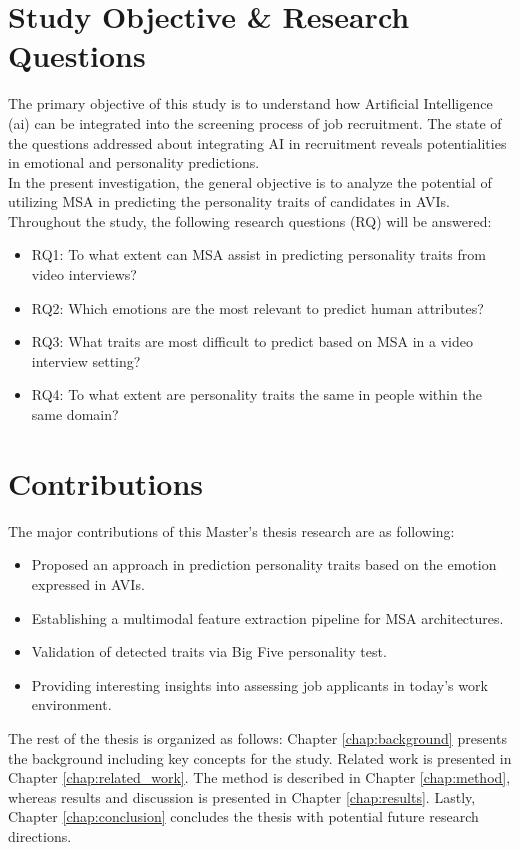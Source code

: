 \section{Study Objective \& Research Questions}
The primary objective of this study is to understand how Artificial Intelligence (\acrshort{ai}) can be integrated into the screening process of job recruitment. The state of the questions addressed about integrating AI in recruitment reveals potentialities in emotional and personality predictions. \\

In the present investigation, the general objective is to analyze the potential of utilizing MSA in predicting the personality traits of candidates in AVIs. Throughout the study, the following research questions (RQ) will be answered:
%
\begin{itemize}
    \item[] RQ1: To what extent can MSA assist in predicting personality traits from video interviews? \\
    \item[] RQ2: Which emotions are the most relevant to predict human attributes? \\
    \item[] RQ3: What traits are most difficult to predict based on MSA in a video interview setting?  \\
    \item[] RQ4: To what extent are personality traits the same in people within the same domain? \\
\end{itemize}

\section{Contributions}
The major contributions of this Master's thesis research are as following:
\begin{itemize}
    \item Proposed an approach in prediction personality traits based on the emotion expressed in AVIs. \\
    \item Establishing a multimodal feature extraction pipeline for MSA architectures. \\
    \item Validation of detected traits via Big Five personality test. \\
    \item Providing interesting insights into assessing job applicants in today's work environment. 
\end{itemize}
%
The rest of the thesis is organized as follows: Chapter \ref{chap:background} presents the background including key concepts for the study. Related work is presented in Chapter \ref{chap:related_work}. The method is described in Chapter \ref{chap:method}, whereas results and discussion is presented in Chapter \ref{chap:results}. Lastly, Chapter \ref{chap:conclusion} concludes the thesis with potential future research directions. 
